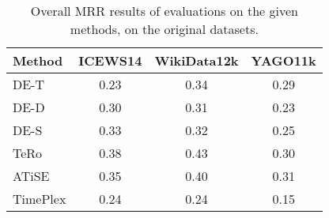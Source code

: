 \begin{table}[htb]
\centering
\begin{minipage}{0.95\columnwidth}
\centering
\caption{Overall MRR results of evaluations on the given methods, on the original datasets.}
\vspace{-3mm}

\begin{tabular}{l|ccc}
\hline
Method & ICEWS14 & WikiData12k & YAGO11k\\
\hline
DE-T     & 0.23 & 0.34 & 0.29 \\
DE-D     & 0.30 & 0.31 & 0.23 \\
DE-S     & 0.33 & 0.32 & 0.25 \\
TeRo     & 0.38 & 0.43 & 0.30 \\
ATiSE    & 0.35 & 0.40 & 0.31 \\
TimePlex & 0.24 & 0.24 & 0.15 \\
\hline

\end{tabular}

\label{tab:overall_results}
\end{minipage}
\end{table}
